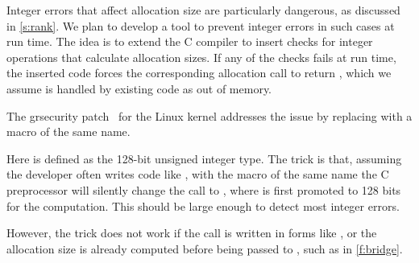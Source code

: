Integer errors that affect allocation size are particularly dangerous,
as discussed in \autoref{s:rank}.
We plan to develop a tool to prevent integer errors
in such cases at run time.
The idea is to extend the C compiler
to insert checks for integer operations that calculate allocation sizes.
If any of the checks fails at run time,
the inserted code forces the corresponding allocation call to return
, which we assume is handled by existing code
as out of memory.

\fi

The grsecurity patch~\cite{grsecurity}
for the Linux kernel addresses the issue by replacing
 with a macro of the same name.
%

%
Here  is defined as the 128-bit unsigned integer
type.  The trick is that, assuming the developer often writes code
like , with the macro of the same name
the C preprocessor will silently change the call to
, where  is first
promoted to 128 bits for the computation.  This should be large
enough to detect most integer errors.

However, the trick does not work if the call is written in forms
like , or the allocation
size is already computed before being passed to , such
as in \autoref{f:bridge}.
\fi
